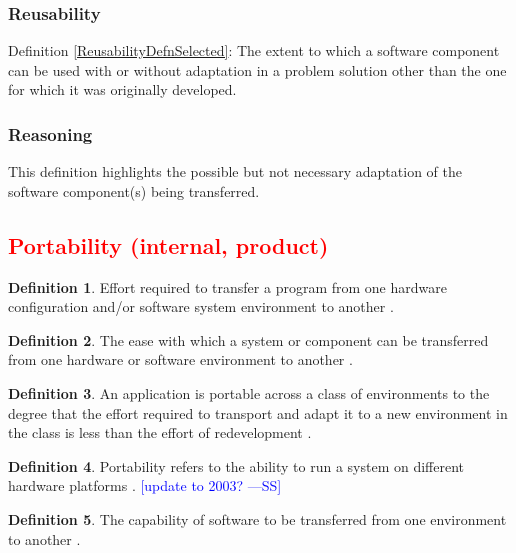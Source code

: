 \documentclass[letterpaper, cleveref]{lipics-v2019}
\newcommand{\authornote}[3]{\textcolor{#1}{[#3 ---#2]}}
\newcommand{\authornote}[3]{}
\newcommand{\wss}[1]{\authornote{blue}{SS}{#1}} %
\newcommand{\pmi}[1]{\authornote{green}{PM}{#1}} %
\newcommand{\notdone}[1]{\textcolor{red}{#1}}
\theoremstyle{definition}
\newtheorem{defn}{Definition}
\begin{document}
\begin{mybox}
\subsubsection*{Reusability}
Definition \ref{ReusabilityDefnSelected}: The extent to which a software
component can be used with or without adaptation in a problem solution other
than the one for which it was originally developed.
\end{mybox}

\subsubsection*{Reasoning}

This definition highlights the possible but not necessary adaptation of the
software component(s) being transferred.


\subsection{\notdone{Portability (internal, product)}} %

\begin{defn} \label{PortabilityDefnSelected}
  Effort required to transfer a program from one hardware configuration
  and/or software system environment to another \citep{McCallEtAl1977}.
\end{defn}

\begin{defn}
  The ease with which a system or component can be transferred from one
  hardware or software environment to another \citep{IEEEStdGlossarySET1990}.
\end{defn}

\begin{defn}
  An application is portable across a class of environments to the degree
  that the effort required to transport and adapt it to a new environment in
  the class is less than the effort of redevelopment
  \citep{mooney1990strategies}.
\end{defn}

\begin{defn}
  Portability refers to the ability to run a system on different hardware
  platforms \citep{ghezzi1991fundamentals}.  \wss{update to 2003?}
\end{defn}

\begin{defn}
  The capability of software to be transferred from one environment to
  another \cite{ISO9126}. %
\end{defn}
\end{document}
